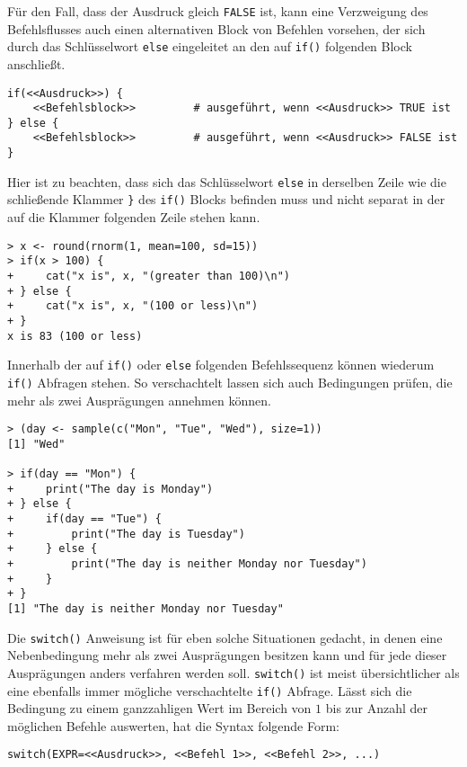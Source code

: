 Für den Fall, dass der Ausdruck gleich \lstinline!FALSE! ist, kann eine Verzweigung des Befehlsflusses auch einen alternativen Block von Befehlen vorsehen, der sich durch das Schlüsselwort \lstinline!else! eingeleitet an den auf \lstinline!if()! folgenden Block anschließt.
\begin{lstlisting}
if(<<Ausdruck>>) {
    <<Befehlsblock>>         # ausgeführt, wenn <<Ausdruck>> TRUE ist
} else {
    <<Befehlsblock>>         # ausgeführt, wenn <<Ausdruck>> FALSE ist
}
\end{lstlisting}

Hier ist zu beachten, dass sich das Schlüsselwort \lstinline!else! in derselben Zeile wie die schließende Klammer \lstinline!}! des \lstinline!if()! Blocks befinden muss und nicht separat in der auf die Klammer folgenden Zeile stehen kann.
\begin{lstlisting}
> x <- round(rnorm(1, mean=100, sd=15))
> if(x > 100) {
+     cat("x is", x, "(greater than 100)\n")
+ } else {
+     cat("x is", x, "(100 or less)\n")
+ }
x is 83 (100 or less)
\end{lstlisting}

Innerhalb der auf \lstinline!if()! oder \lstinline!else! folgenden Befehlssequenz können wiederum \lstinline!if()! Abfragen stehen. So verschachtelt lassen sich auch Bedingungen prüfen, die mehr als zwei Ausprägungen annehmen können.
\begin{lstlisting}
> (day <- sample(c("Mon", "Tue", "Wed"), size=1))
[1] "Wed"

> if(day == "Mon") {
+     print("The day is Monday")
+ } else {
+     if(day == "Tue") {
+         print("The day is Tuesday")
+     } else {
+         print("The day is neither Monday nor Tuesday")
+     }
+ }
[1] "The day is neither Monday nor Tuesday"
\end{lstlisting}

Die \lstinline!switch()! Anweisung ist für eben solche Situationen gedacht, in denen eine Nebenbedingung mehr als zwei Ausprägungen besitzen kann und für jede dieser Ausprägungen anders verfahren werden soll. \lstinline!switch()! ist meist übersichtlicher als eine ebenfalls immer mögliche verschachtelte \lstinline!if()! Abfrage. Lässt sich die Bedingung zu einem ganzzahligen Wert im Bereich von $1$ bis zur Anzahl der möglichen Befehle auswerten, hat die Syntax folgende Form:
\begin{lstlisting}
switch(EXPR=<<Ausdruck>>, <<Befehl 1>>, <<Befehl 2>>, ...)
\end{lstlisting}

